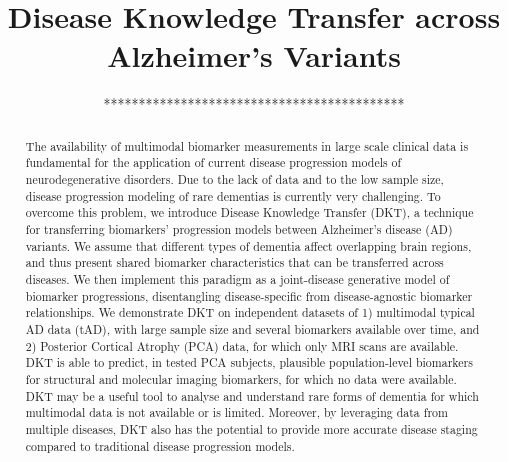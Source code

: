 \documentclass{llncs}
\begin{document}

\title{Disease Knowledge Transfer across Alzheimer's Variants}
%
%

% 
% 

\author{*******************************************}

\institute{***************************************}


\maketitle              %


\newcommand{\expFld}{../resfiles/tad-drcTiny_JMD}
\newcommand{\jmdFld}{..}

\begin{abstract}
The availability of multimodal biomarker measurements in large scale clinical data is fundamental for the application of current disease progression models of neurodegenerative disorders. Due to the lack of data and to the low sample size, disease progression modeling of rare dementias is currently very challenging. To overcome this problem, we introduce Disease Knowledge Transfer (DKT), a technique for transferring biomarkers' progression models between Alzheimer's disease (AD) variants. We assume that different types of dementia affect overlapping brain regions, and thus present shared biomarker characteristics that can be transferred across diseases. We then implement this paradigm as a joint-disease generative model of biomarker progressions, disentangling disease-specific from  disease-agnostic biomarker relationships. We demonstrate DKT on independent datasets of 1) multimodal typical AD data (tAD), with large sample size and several biomarkers available over time, and 2) Posterior Cortical Atrophy (PCA) data, for which only MRI scans are available. DKT is able to predict, in tested PCA subjects, plausible population-level biomarkers for structural and molecular imaging biomarkers, for which no data were available. DKT may be a useful tool to analyse and understand rare forms of dementia for which multimodal data is not available or is limited. Moreover, by leveraging data from multiple diseases, DKT also has the potential to provide more accurate disease staging compared to traditional disease progression models.


\end{abstract}
\end{document}
